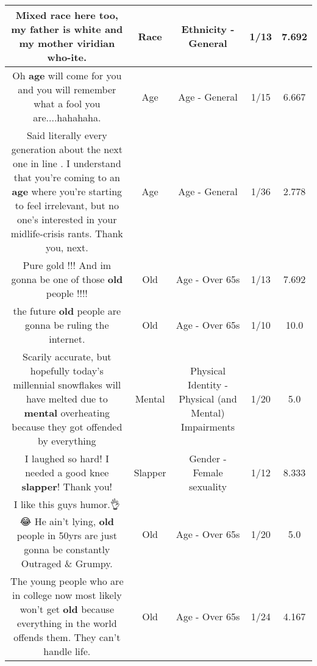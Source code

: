 \documentclass[11pt]{article}
\newlength\mylength
\begin{document}
\begin{center}
\begin{longtable}{|C{.65\mylength}|C{.30\mylength}|C{.12\mylength}|C{.12\mylength}|C{.12\mylength}|}
  \small Mixed \textbf{race} here too, my father is white and my mother viridian who-ite.\normalsize   & Race & Ethnicity - General & 1/13 & 7.692 \\  \hline
  \small Oh \textbf{age} will come for you and you will remember what a fool you are....hahahaha.\normalsize   & Age & Age - General & 1/15 & 6.667 \\  \hline
  \small Said literally every generation about the next one in line . I understand that you're coming to an \textbf{age} where you're starting to feel irrelevant, but no one's interested in your midlife-crisis rants. Thank you, next.\normalsize   & Age & Age - General & 1/36 & 2.778 \\  \hline
  \small Pure gold !!! And im gonna be one of those \textbf{old} people !!!!\normalsize   & Old & Age - Over 65s & 1/13 & 7.692 \\  \hline
  \small the future \textbf{old} people are gonna be ruling the internet.\normalsize   & Old & Age - Over 65s & 1/10 & 10.0 \\  \hline
  \small Scarily accurate, but hopefully today's millennial snowflakes will have melted due to \textbf{mental} overheating because they got offended by everything\normalsize   & Mental & Physical Identity - Physical (and Mental) Impairments & 1/20 & 5.0 \\  \hline
  \small I laughed so hard! I needed a good knee \textbf{slapper}! Thank you!\normalsize   & Slapper & Gender - Female sexuality & 1/12 & 8.333 \\  \hline
  \small I like this guys humor.👌😂 He ain't lying, \textbf{old} people in 50yrs are just gonna be constantly Outraged \& Grumpy.\normalsize   & Old & Age - Over 65s & 1/20 & 5.0 \\  \hline
  \small The young people who are in college now most likely won't get \textbf{old} because everything in the world offends them. They can't handle life.\normalsize   & Old & Age - Over 65s & 1/24 & 4.167 \\  \hline

\end{longtable}
\end{center}
\end{document}
